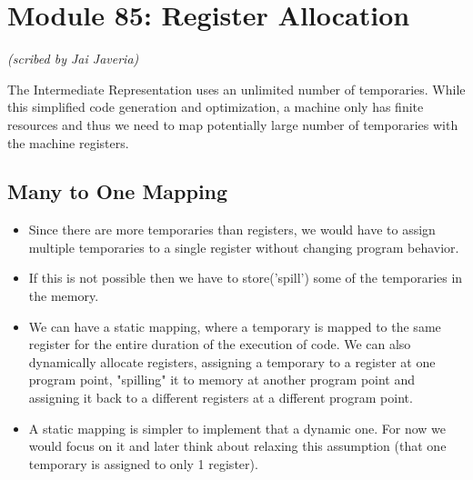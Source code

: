 \section{Module 85: Register Allocation}
\begin{flushright}
\textit{(scribed by Jai Javeria)}
\end{flushright}
The Intermediate Representation uses an unlimited number of temporaries. While this simplified code generation and optimization, a machine only has  finite resources and thus we need to map potentially large number of temporaries with the machine registers.

\subsection{Many to One Mapping}
\begin{itemize}
    \item Since there are more temporaries than registers, we would have to assign multiple temporaries to a single register without changing program behavior. 
    \item If this is not possible then we have to store('spill') some of the temporaries in the memory.
    \item We can have a static mapping, where a temporary is mapped to the same register for the entire duration of the execution of code. We can also dynamically allocate registers, assigning a temporary to a register at one program point, "spilling" it to memory at another program point and assigning it back to a different registers at a different program point.
    \item A static mapping is simpler to implement that a dynamic one. For now we would focus on it and later think about relaxing this assumption (that one temporary is assigned to only 1 register).
\end{itemize}
